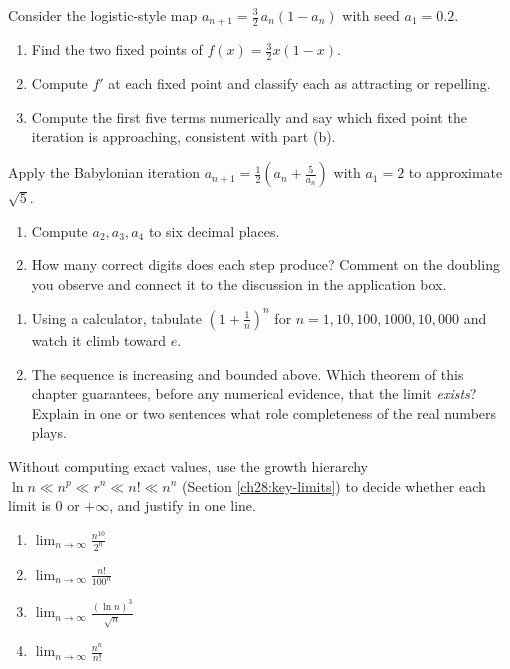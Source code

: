 \begin{exercise}
\label{ch28:exr-cobweb}
Consider the logistic-style map $a_{n+1} = \tfrac32\,a_n(1 - a_n)$ with seed
$a_1 = 0.2$.
\begin{enumerate}[label=(\alph*)]
  \item Find the two fixed points of $f(x) = \tfrac32 x(1-x)$.
  \item Compute $f'$ at each fixed point and classify each as attracting or
        repelling.
  \item Compute the first five terms numerically and say which fixed point the
        iteration is approaching, consistent with part (b).
\end{enumerate}
\end{exercise}

\begin{exercise}
\label{ch28:exr-babylonian}
Apply the Babylonian iteration $a_{n+1} = \tfrac12(a_n + \tfrac{5}{a_n})$ with
$a_1 = 2$ to approximate $\sqrt5$.
\begin{enumerate}[label=(\alph*)]
  \item Compute $a_2, a_3, a_4$ to six decimal places.
  \item How many correct digits does each step produce? Comment on the doubling
        you observe and connect it to the discussion in the application box.
\end{enumerate}
\end{exercise}

\begin{exercise}
\label{ch28:exr-e}
\begin{enumerate}[label=(\alph*)]
  \item Using a calculator, tabulate $(1 + \tfrac1n)^n$ for $n = 1, 10, 100,
        1000, 10{,}000$ and watch it climb toward $e$.
  \item The sequence is increasing and bounded above. Which theorem of this
        chapter guarantees, before any numerical evidence, that the limit
        \emph{exists}? Explain in one or two sentences what role completeness of
        the real numbers plays.
\end{enumerate}
\end{exercise}

\begin{exercise}
\label{ch28:exr-growth-ladder}
Without computing exact values, use the growth hierarchy $\ln n \ll n^p \ll r^n
\ll n! \ll n^n$ (Section \ref{ch28:key-limits}) to decide whether each limit is
$0$ or $+\infty$, and justify in one line.
\begin{enumerate}[label=(\alph*)]
  \item $\displaystyle\lim_{n\to\infty} \frac{n^{10}}{2^n}$
  \item $\displaystyle\lim_{n\to\infty} \frac{n!}{100^n}$
  \item $\displaystyle\lim_{n\to\infty} \frac{(\ln n)^3}{\sqrt n}$
  \item $\displaystyle\lim_{n\to\infty} \frac{n^n}{n!}$
\end{enumerate}
\end{exercise}

